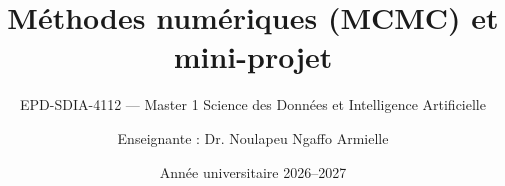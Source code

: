 
\title[Chapitre 5 --- Méthodes numériques (MCMC) et mini-projet]{Méthodes numériques (MCMC) et mini-projet}
\subtitle{EPD-SDIA-4112 --- Master 1 Science des Données et Intelligence Artificielle}
\author{Enseignante : Dr. Noulapeu Ngaffo Armielle}
\date{Année universitaire 2026--2027}





